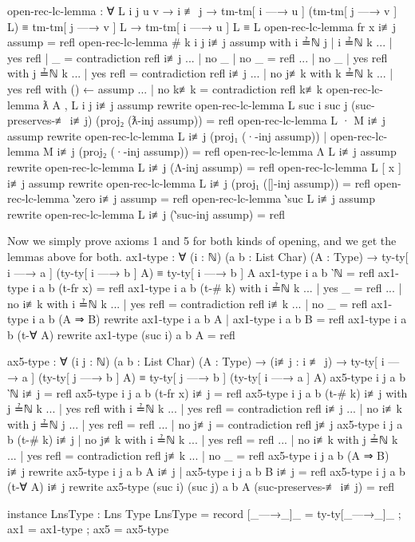 \documentclass[logo,bsc,singlespacing,parskip,online]{infthesis}
\renewenvironment{code}{\mintedcopy[breaklines,breaksymbolleft=\;]{agda}}{\endmintedcopy}
\begin{document}
\begin{code}
  open-rec-lc-lemma : ∀ {L i j u v}
    → i ≢ j
    → tm-tm[ i —→ u ] (tm-tm[ j —→ v ] L) ≡ tm-tm[ j —→ v ] L
    → tm-tm[ i —→ u ] L ≡ L
  open-rec-lc-lemma {fr x} i≢j assump = refl
  open-rec-lc-lemma {# k} {i} {j} i≢j assump
    with i ≟ℕ j | i ≟ℕ k
  ... | yes refl | _ = contradiction refl i≢j
  ... | no _     | no _ = refl
  ... | no _     | yes refl with j ≟ℕ k
  ...   | yes refl = contradiction refl i≢j
  ...   | no j≢k with k ≟ℕ k
  ...     | yes refl with () ← assump
  ...     | no  k≢k  = contradiction refl k≢k
  open-rec-lc-lemma {ƛ A , L} {i} {j} i≢j assump
    rewrite open-rec-lc-lemma {L} {suc i} {suc j}
      (suc-preserves-≢ i≢j)
      (proj₂ (ƛ-inj assump))
    = refl
  open-rec-lc-lemma {L · M} i≢j assump rewrite
      open-rec-lc-lemma {L} i≢j (proj₁ (·-inj assump))
    | open-rec-lc-lemma {M} i≢j (proj₂ (·-inj assump))
    = refl
  open-rec-lc-lemma {Λ L} i≢j assump
    rewrite open-rec-lc-lemma {L} i≢j (Λ-inj assump) = refl
  open-rec-lc-lemma {L [ x ]} i≢j assump
    rewrite open-rec-lc-lemma {L} i≢j (proj₁ ([]-inj assump)) = refl
  open-rec-lc-lemma {‵zero} i≢j assump = refl
  open-rec-lc-lemma {‵suc L} i≢j assump
    rewrite open-rec-lc-lemma {L} i≢j (‵suc-inj assump) = refl
\end{code}

Now we simply prove axioms 1 and 5 for both kinds of opening, and we get the lemmas above for both.
\begin{code}
  ax1-type : ∀ (i : ℕ) (a b : List Char) (A : Type)
    → ty-ty[ i —→ a ] (ty-ty[ i —→ b ] A) ≡ ty-ty[ i —→ b ] A
  ax1-type i a b ‵ℕ = refl
  ax1-type i a b (t-fr x) = refl
  ax1-type i a b (t-# k) with i ≟ℕ k
  ... | yes _   = refl
  ... | no  i≢k with i ≟ℕ k
  ... | yes refl = contradiction refl i≢k
  ... | no  _    = refl
  ax1-type i a b (A ⇒ B)
    rewrite ax1-type i a b A | ax1-type i a b B = refl
  ax1-type i a b (t-∀ A) rewrite ax1-type (suc i) a b A = refl

  ax5-type : ∀ (i j : ℕ) (a b : List Char) (A : Type)
    → (i≢j : i ≢ j)
    → ty-ty[ i —→ a ] (ty-ty[ j —→ b ] A)
      ≡ ty-ty[ j —→ b ] (ty-ty[ i —→ a ] A)
  ax5-type i j a b ‵ℕ i≢j = refl
  ax5-type i j a b (t-fr x) i≢j = refl
  ax5-type i j a b (t-# k) i≢j with j ≟ℕ k
  ... | yes refl with i ≟ℕ k
  ... |   yes refl = contradiction refl i≢j
  ... |   no  i≢k  with j ≟ℕ j
  ... |     yes refl = refl
  ... |     no  j≢j  = contradiction refl j≢j
  ax5-type i j a b (t-# k) i≢j | no j≢k with i ≟ℕ k
  ... | yes refl = refl
  ... | no  i≢k  with j ≟ℕ k
  ... |   yes refl = contradiction refl j≢k
  ... |   no  _    = refl
  ax5-type i j a b (A ⇒ B) i≢j
    rewrite ax5-type i j a b A i≢j | ax5-type i j a b B i≢j = refl
  ax5-type i j a b (t-∀ A) i≢j
    rewrite ax5-type (suc i) (suc j) a b A (suc-preserves-≢ i≢j)
          = refl
  
  instance
    LnsType : Lns Type
    LnsType = record
      { [_—→_]_ = ty-ty[_—→_]_
      ; ax1 = ax1-type
      ; ax5 = ax5-type }
\end{code}
\end{document}
